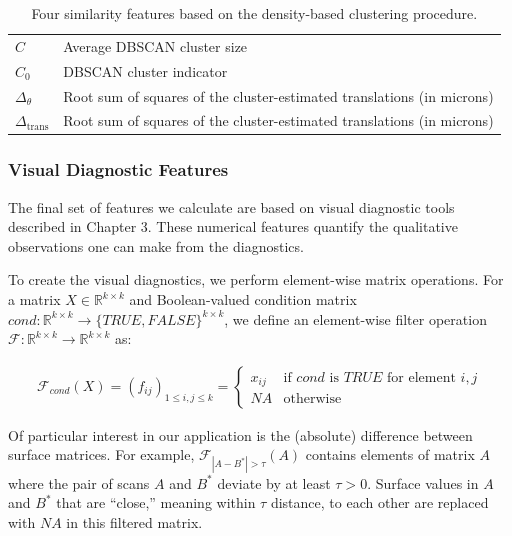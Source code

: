 \documentclass[11pt,]{isuthesis}
\begin{document}
\begin{table}

\caption{\label{tab:dbscanFeatures-latex}Four similarity features based on the density-based clustering procedure.}
\centering
\begin{tabu} to 
\toprule
$C$ & Average DBSCAN cluster size\\
$C_0$ & DBSCAN cluster indicator\\
$\Delta_{\theta}$ & Root sum of squares of the cluster-estimated translations (in microns)\\
$\Delta_{\text{trans}}$ & Root sum of squares of the cluster-estimated translations (in microns)\\
\bottomrule
\end{tabu}
\end{table}

\hypertarget{visual-diagnostic-features}{%
\subsubsection{Visual Diagnostic Features}\label{visual-diagnostic-features}}

The final set of features we calculate are based on visual diagnostic tools described in Chapter 3.
These numerical features quantify the qualitative observations one can make from the diagnostics.

To create the visual diagnostics, we perform element-wise matrix operations.
For a matrix \(X \in \mathbb{R}^{k \times k}\) and Boolean-valued condition matrix \(cond: \mathbb{R}^{k \times k} \to \{TRUE,FALSE\}^{k \times k}\), we define an element-wise filter operation \(\mathcal{F}: \mathbb{R}^{k \times k} \to \mathbb{R}^{k \times k}\) as:

\begin{align*}
\mathcal{F}_{cond}(X) = 
(f_{ij})_{1 \leq i,j \leq k} =
\begin{cases}
x_{ij} &\text{if $cond$ is $TRUE$ for element $i,j$} \\
NA &\text{otherwise}
\end{cases}
\end{align*}

Of particular interest in our application is the (absolute) difference between surface matrices.
For example, \(\mathcal{F}_{|A - B^*| > \tau}(A)\) contains elements of matrix \(A\) where the pair of scans \(A\) and \(B^*\) deviate by at least \(\tau > 0\).
Surface values in \(A\) and \(B^*\) that are ``close,'' meaning within \(\tau\) distance, to each other are replaced with \(NA\) in this filtered matrix.
\end{document}
